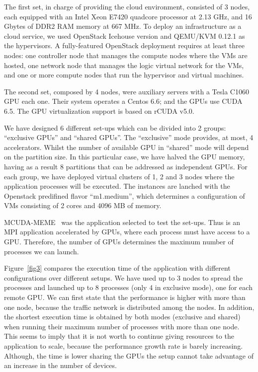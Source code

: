 \documentclass[a4paper,twoside]{article}
\begin{document}
The first set, in charge of providing the cloud environment,
consisted of 3 nodes, each equipped with an Intel Xeon E7420 quadcore processor at
2.13 GHz, and 16 Gbytes of DDR2 RAM memory at 667 MHz.
To deploy an infrastructure as a cloud service, we used OpenStack Icehouse version and QEMU/KVM 0.12.1 as the hypervisors.
A fully-featured OpenStack deployment requires at least three nodes: one controller node that manages the compute nodes 
where the VMs are hosted, one network node that manages the logic
virtual network for the VMs, and one or more compute nodes that 
run the hypervisor and virtual machines.

The second set, composed by 4 nodes, were auxiliary servers with a Tesla C1060 GPU each one. 
Their system operates a Centos 6.6; and the GPUs use CUDA 6.5. 
The GPU virtualization support is based on rCUDA v5.0. 

We have designed 6 different set-ups which can be divided into 2 groups: “exclusive GPUs” and “shared GPUs”. 
The “exclusive” mode provides, at most, 4 accelerators. 
Whilst the number of available GPU in “shared” mode will depend on the partition size. 
In this particular case, we have halved the GPU memory, having as a result 8 partitions that can be addressed as independent GPUs.
For each group, we have deployed virtual clusters of 1, 2 and 3 nodes where the application processes will be executed. 
The instances are lanched with the Openstack predifined flavor “m1.medium”, which determines a configuration of VMs consisting of 2 cores and 4096 MB of memory.

MCUDA-MEME~\cite{Liu2010} was the application selected to test the set-ups. 
Thus is an MPI application accelerated by GPUs, where each process must have access to a GPU.
Therefore, the number of GPUs determines the maximum number of processes we can launch.

Figure~\ref{fig3} compares the execution time of the application with different configurations over different setups. 
We have used up to 3 nodes to spread the processes and launched up to 8 processes (only 4 in exclusive mode), one for each remote GPU.
We can first state that the performance is higher with more than one node, because the traffic network is distributed among the nodes.
In addition, the shortest execution time is obtained by both modes (exclusive and shared) when running their maximum number of processes with more than one node.
This seems to imply that it is not worth to continue giving resources to the application to scale, because the performance growth rate is barely increasing.
Although, the time is lower sharing the GPUs the setup cannot take advantage of an increase in the number of devices.
\end{document}
